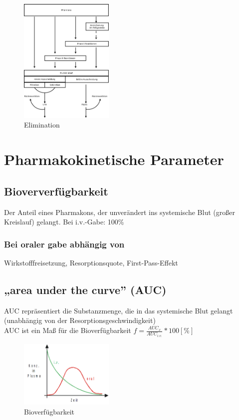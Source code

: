 \documentclass[10pt,a4paper]{report}
\begin{document}
\begin{figure}[h]
	\centering 
	\includegraphics[width=0.4\textwidth]{Bilder/Elimination.png} 
	\caption{Elimination} 
	\label{fig:Elimination}
\end{figure}

\section{Pharmakokinetische Parameter} 

\subsection{Bioververfügbarkeit}
Der Anteil eines Pharmakons, der unverändert ins systemische Blut (großer Kreislauf) gelangt. Bei i.v.-Gabe: 100\%\\

\subsubsection{Bei oraler gabe abhängig von}
Wirkstofffreisetzung, Resorptionsquote, First-Pass-Effekt\\

\subsection{„area under the curve” (AUC)}
AUC repräsentiert die Substanzmenge, die in das systemische Blut gelangt 
(unabhängig von der Resorptionsgeschwindigkeit)\\
AUC ist ein Maß für die Bioverfügbarkeit  $f=\frac{AUC_x}{AUC_{i.v.}}*100[\%]$

\begin{figure}[h]
	\centering 
	\includegraphics[width=0.4\textwidth]{Bilder/konzentrationzeit.png} 
	\caption{Bioverfügbarkeit} 
	\label{fig:Bioverfuegbarkeit}
\end{figure}
\end{document}
